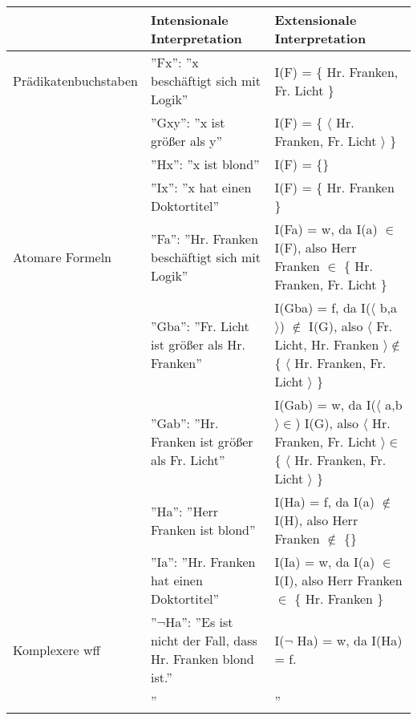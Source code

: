 \documentclass{scrartcl}
\begin{document}
\begin{landscape}
	\begin{tabularx}{\linewidth}{|l|X|X|}
		\hline
		& Intensionale Interpretation & Extensionale Interpretation \\
		\hline
		Prädikatenbuchstaben & ''Fx'': ''x beschäftigt sich mit Logik'' & I(F) = \{ Hr. Franken, Fr. Licht \} \\
		& ''Gxy'': ''x ist größer als y'' & I(F) = \{ $ \langle $ Hr. Franken, Fr. Licht $ \rangle $ \} \\
		& ''Hx'': ''x ist blond'' & I(F) = \{\} \\
		& ''Ix'': ''x hat einen Doktortitel'' & I(F) = \{ Hr. Franken \} \\
		\hline
		Atomare Formeln & ''Fa'': ''Hr. Franken beschäftigt sich mit Logik'' & I(Fa) = w, da I(a) $ \in $ I(F), also Herr Franken $ \in $ \{ Hr. Franken, Fr. Licht \} \\
		& ''Gba'': ''Fr. Licht ist größer als Hr. Franken'' & I(Gba) = f, da I($ \langle $ b,a $ \rangle $) $ \not \in $ I(G), also $ \langle $ Fr. Licht, Hr. Franken $ \rangle \not \in $ \{ $ \langle $ Hr. Franken, Fr. Licht $ \rangle $ \} \\
		& ''Gab'': ''Hr. Franken ist größer als Fr. Licht'' & I(Gab) = w, da I($ \langle $ a,b $ \rangle \in $) I(G), also $ \langle $ Hr. Franken, Fr. Licht $ \rangle \in $ \{ $ \langle $ Hr. Franken, Fr. Licht $ \rangle $ \} \\
		& ''Ha'': ''Herr Franken ist blond'' & I(Ha) = f, da I(a) $ \not \in $ I(H), also Herr Franken $ \not \in $ \{\} \\
		& ''Ia'': ''Hr. Franken hat einen Doktortitel'' & I(Ia) = w, da I(a) $ \in $ I(I), also Herr Franken $ \in $ \{ Hr. Franken \} \\
		\hline
		Komplexere wff & ''$ \neg $Ha'': ''Es ist nicht der Fall, dass Hr. Franken blond ist.'' & I($ \neg $ Ha) = w, da I(Ha) = f. \\
		& '' & '' \\
		\hline
	\end{tabularx}
\end{landscape}
\end{document}
